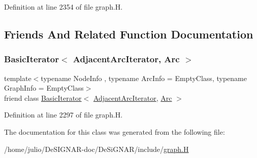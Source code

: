 Definition at line 2354 of file graph.\+H.



\subsection{Friends And Related Function Documentation}
\mbox{\label{class_designar_1_1_digraph_1_1_adjacent_arc_iterator_a73ad70d76f3331ee4b07451db1347918}} 
\subsubsection{\texorpdfstring{Basic\+Iterator$<$ Adjacent\+Arc\+Iterator, Arc $>$}{BasicIterator< AdjacentArcIterator, Arc >}}
{\footnotesize\ttfamily template$<$typename Node\+Info , typename Arc\+Info  = Empty\+Class, typename Graph\+Info  = Empty\+Class$>$ \\
friend class \hyperlink{class_designar_1_1_basic_iterator}{Basic\+Iterator}$<$ \hyperlink{class_designar_1_1_digraph_1_1_adjacent_arc_iterator}{Adjacent\+Arc\+Iterator}, \hyperlink{class_designar_1_1_digraph_a0ceb278671f2a535c00fddccdeafd69f}{Arc} $>$\hspace{0.3cm}{\ttfamily [friend]}}



Definition at line 2297 of file graph.\+H.



The documentation for this class was generated from the following file\+:\begin{DoxyCompactItemize}
\item 
/home/julio/\+De\+S\+I\+G\+N\+A\+R-\/doc/\+De\+Si\+G\+N\+A\+R/include/\hyperlink{graph_8_h}{graph.\+H}\end{DoxyCompactItemize}
